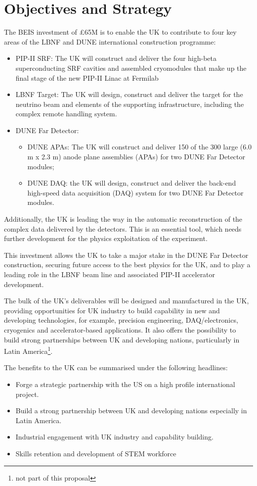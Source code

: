 \section{Objectives and Strategy}

The BEIS investment of £65M is to enable the UK to contribute to four key areas of the LBNF and DUNE international construction programme:
\begin{itemize}
    \item PIP-II SRF: The UK will construct and deliver the four high-beta superconducting SRF cavities and assembled cryomodules that make up the final stage of the new PIP-II Linac at Fermilab
    \item LBNF Target: The UK will design, construct and deliver the target for the neutrino beam and elements of the supporting infrastructure, including the complex remote handling system.
    \item DUNE Far Detector:
    \begin{itemize}
        \item DUNE APAs: The UK will construct and deliver 150 of the 300 large (6.0 m x 2.3 m) anode plane assemblies (APAs) for two DUNE Far Detector modules;
        \item DUNE DAQ: the UK will design, construct and deliver the back-end high-speed data acquisition (DAQ) system for two DUNE Far Detector modules.
    \end{itemize}
\end{itemize}
Additionally, the UK is leading the way in the automatic reconstruction of the complex data delivered by the detectors. This is an essential tool, which needs further development for the physics exploitation of the experiment.

This investment allows the UK to take a major stake in the DUNE Far Detector construction, securing future access to the best physics for the UK, and to play a leading role in the LBNF beam line and associated PIP-II accelerator development.

The bulk of the UK’s deliverables will be designed and manufactured in the UK, providing opportunities for UK industry to build capability in new and developing technologies, for example, precision engineering, DAQ/electronics, cryogenics and accelerator-based applications. It also offers the possibility to build strong partnerships between UK and developing nations, particularly in Latin America\footnote{not part of this proposal}.

The benefits to the UK can be summarised under the following headlines:
\begin{itemize}
    \item Forge a strategic partnership with the US on a high profile international project.
    \item Build a strong partnership between UK and developing nations especially in Latin America.
    \item Industrial engagement with UK industry and capability building.
    \item Skills retention and development of STEM workforce
\end{itemize}

